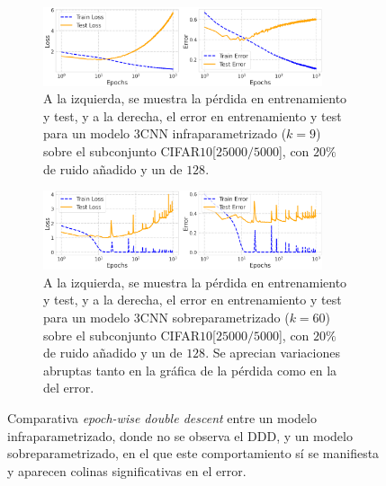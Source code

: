 \begin{figure}[h]
    \centering
    \begin{subfigure}[b]{\textwidth}
        \centering
        \includegraphics[width=0.9\textwidth]{img/experiments/epoch-wise3CNNunderparameterized.png}
        \caption{A la izquierda, se muestra la pérdida en entrenamiento y test, y a la derecha, el error en entrenamiento y test para un modelo $3$CNN infraparametrizado ($k=9$) sobre el subconjunto CIFAR$10$[$25000/5000$], con $20\%$ de ruido añadido y un  de $128$.}\label{fig:epoch-wise3CNNunderparameterized}
    \end{subfigure}
    
    \vspace{1em} 

    \begin{subfigure}[b]{\textwidth}
        \centering
        \includegraphics[width=0.9\textwidth]{img/experiments/epoch-wise3CNNoverparameterized.png}
        \caption{A la izquierda, se muestra la pérdida en entrenamiento y test, y a la derecha, el error en entrenamiento y test para un modelo $3$CNN sobreparametrizado ($k=60$) sobre el subconjunto CIFAR$10$[$25000/5000$], con $20\%$ de ruido añadido y un  de $128$. Se aprecian variaciones abruptas tanto en la gráfica de la pérdida como en la del error.}\label{fig:epoch-wise3CNNoverparameterized}
    \end{subfigure}
    
    \caption[Comparativa \textit{epoch-wise double descent} entre un modelo infraparametrizado y uno sobreparametrizado en el que aparecen picos significativos en el error.]{Comparativa \textit{epoch-wise double descent} entre un modelo infraparametrizado, donde no se observa el DDD, y un modelo sobreparametrizado, en el que este comportamiento sí se manifiesta y aparecen colinas significativas en el error.}\label{fig:epoch-wise-bruscos1}
\end{figure}

